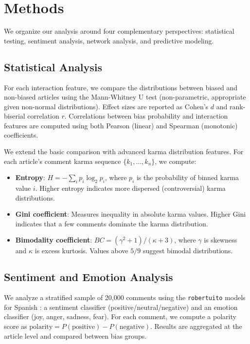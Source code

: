 \section{Methods}
\label{sec:methods}

We organize our analysis around four complementary perspectives: statistical testing, sentiment analysis, network analysis, and predictive modeling.

\subsection{Statistical Analysis}

For each interaction feature, we compare the distributions between biased and non-biased articles using the Mann-Whitney U test (non-parametric, appropriate given non-normal distributions).
Effect sizes are reported as Cohen's $d$ and rank-biserial correlation $r$.
Correlations between bias probability and interaction features are computed using both Pearson (linear) and Spearman (monotonic) coefficients.

We extend the basic comparison with advanced karma distribution features.
For each article's comment karma sequence $\{k_1, \ldots, k_n\}$, we compute:
\begin{itemize}
    \item \textbf{Entropy}: $H = -\sum_i p_i \log_2 p_i$, where $p_i$ is the probability of binned karma value $i$. Higher entropy indicates more dispersed (controversial) karma distributions.
    \item \textbf{Gini coefficient}: Measures inequality in absolute karma values. Higher Gini indicates that a few comments dominate the karma distribution.
    \item \textbf{Bimodality coefficient}: $BC = (\gamma^2 + 1) / (\kappa + 3)$, where $\gamma$ is skewness and $\kappa$ is excess kurtosis. Values above $5/9$ suggest bimodal distributions.
\end{itemize}

\subsection{Sentiment and Emotion Analysis}

We analyze a stratified sample of 20,000 comments using the \texttt{robertuito} models for Spanish \cite{perez2022robertuito}: a sentiment classifier (positive/neutral/negative) and an emotion classifier (joy, anger, sadness, fear).
For each comment, we compute a polarity score as $\text{polarity} = P(\text{positive}) - P(\text{negative})$.
Results are aggregated at the article level and compared between bias groups.


